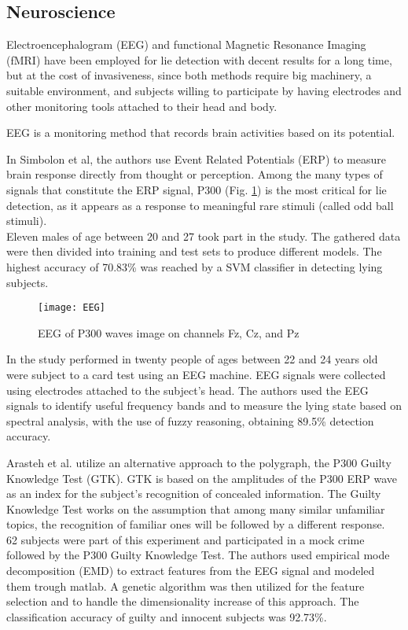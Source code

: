 \subsection{Neuroscience} \label{neuro}
Electroencephalogram (EEG) and functional Magnetic Resonance Imaging (fMRI) have been employed for lie detection with decent results for a long time, but at the cost of invasiveness, since both methods require big machinery, a suitable environment, and subjects willing to participate by having electrodes and other monitoring tools attached to their head and body.

EEG is a monitoring method that records brain activities based on its potential.

In \cite{7440177} Simbolon et al, the authors use Event Related Potentials (ERP) to measure brain response directly from thought or perception. Among the many types of signals that constitute the ERP signal, P300 (Fig. \ref{fig:EEG}) is the most critical for lie detection, as it appears as a response to meaningful rare stimuli (called odd ball stimuli). \\
Eleven males of age between 20 and 27 took part in the study. The gathered data were then divided into training and test sets to produce different models. The highest accuracy of 70.83\% was reached by a SVM classifier in detecting lying subjects.

\begin{figure}[H]
	\centering
	\texttt{[image: EEG]}
	\caption{EEG of P300 waves image on channels Fz, Cz, and Pz}
	\label{fig:EEG}
\end{figure}

In the study performed in \cite{Lai2017} twenty people of ages between 22 and 24 years old were subject to a card test using an EEG machine. EEG signals were collected using electrodes attached to the subject’s head. The authors used the EEG signals to identify useful frequency bands and to measure the lying state based on spectral analysis, with the use of fuzzy reasoning, obtaining 89.5\% detection accuracy.

Arasteh et al. \cite{7511728} utilize an alternative approach to the polygraph, the P300 Guilty Knowledge Test (GTK). GTK is based on the amplitudes of the P300 ERP wave as an index for the subject's recognition of concealed information. The Guilty Knowledge Test works on the assumption that among many similar unfamiliar topics, the recognition of familiar ones will be followed by a different response. \\
62 subjects were part of this experiment and participated in a mock crime followed by the P300 Guilty Knowledge Test. The authors used empirical mode decomposition (EMD) to extract features from the EEG signal and modeled them trough matlab. A genetic algorithm was then utilized for the feature selection and to handle the dimensionality increase of this approach. The classification accuracy of guilty and innocent subjects was 92.73\%.

